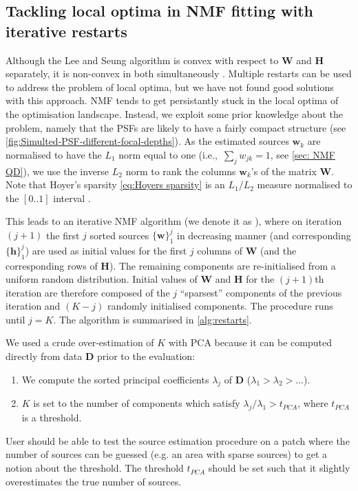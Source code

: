 \subsection{Tackling local optima in NMF fitting with iterative restarts \label{sub: Iterative restarts}}

Although the Lee and Seung algorithm is convex with respect to $\bm{W}$ and $\bm{H}$ separately, it is non-convex in both simultaneously \cite{Lee2001}. Multiple restarts can be used to address the problem of local optima, but we have not found good solutions with this approach. NMF tends to get persistantly stuck in the local optima of the optimisation landscape. Instead, we exploit some prior knowledge about the problem, namely that the PSFs are likely to have a fairly compact structure (see \autoref{fig:Simulted-PSF-different-focal-depths}). As the estimated sources $\bm{w}_k$ are normalised to have the $L_1$ norm equal to one (i.e.,\ $\sum_j w_{jk}=1$, see \autoref{sec: NMF QD}), we use the inverse $L_2$ norm to rank the columns $\bm{w}_k$'s of the matrix $\bm{W}$. Note that Hoyer's sparsity \autoref{eq:Hoyers sparsity} is an $L_1/L_2$ measure normalised to the $[0..1]$ interval \cite{Kim2008}. 

This leads to an iterative NMF algorithm (we denote it as \inmf{}), where on iteration $(j+1)$ the first $j$ sorted sources $\{ \bm{w} \}_1^j$ in decreasing manner (and corresponding $\{ \bm{h} \}_1^j$) are used as initial values for the first $j$ columns of $\bm{W}$ (and the corresponding rows of $\bm{H}$). The remaining components are re-initialised from a uniform random distribution. Initial values of $\bm{W}$ and $\bm{H}$ for the $(j+1)$th iteration are therefore composed of the $j$ ``sparsest'' components of the previous iteration and $(K-j)$ randomly initialised components. The procedure runs until $j=K$. The \inmf{} algorithm is summarised in \autoref{alg:restarts}. 

We used a crude over-estimation of $K$ with PCA because it can be computed directly from data $\bm{D}$ prior to the evaluation: 
%
\begin{enumerate}
	\item
	We compute the sorted principal coefficients $\lambda_j$ of $\bm{D}$ ($\lambda_1>\lambda_2>...$). 
	\item
	$K$ is set to the number of components which satisfy $\lambda_j/\lambda_1>t_{PCA}$, where $t_{PCA}$ is a threshold. 
\end{enumerate}
%
User should be able to test the source estimation procedure on a patch where the number of sources can be guessed (e.g. an area with sparse sources) to get a notion about the threshold. The threshold $t_{PCA}$ should be set such that it slightly overestimates the true number of sources.

